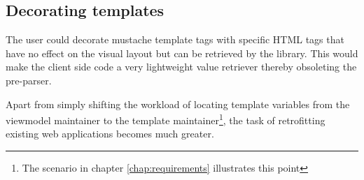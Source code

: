 \documentclass[thesis.tex]{subfiles}
\begin{document}
\subsection{Decorating templates}

The user could decorate mustache template tags with specific HTML tags that
have no effect on the visual layout but can be retrieved by the library.
This would make the client side code a very lightweight value retriever
thereby obsoleting the pre-parser.

Apart from simply shifting the workload of locating template variables
from the viewmodel maintainer to the template maintainer\footnote{The scenario
in chapter \ref{chap:requirements} illustrates this point},
the task of retrofitting existing web applications becomes much greater.
\end{document}
